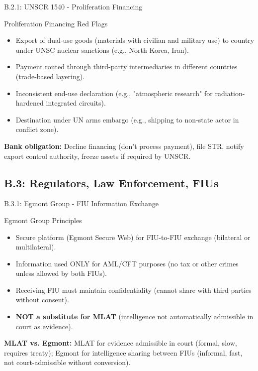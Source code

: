 \documentclass{beamer}
\begin{document}
	\begin{frame}{B.2.1: UNSCR 1540 - Proliferation Financing}
		\begin{block}{Proliferation Financing Red Flags}
			\begin{itemize}
				\item Export of dual-use goods (materials with civilian and military use) to country under UNSC nuclear sanctions (e.g., North Korea, Iran).
				\item Payment routed through third-party intermediaries in different countries (trade-based layering).
				\item Inconsistent end-use declaration (e.g., "atmospheric research" for radiation-hardened integrated circuits).
				\item Destination under UN arms embargo (e.g., shipping to non-state actor in conflict zone).
			\end{itemize}
		\end{block}
		\textbf{Bank obligation:} Decline financing (don't process payment), file STR, notify export control authority, freeze assets if required by UNSCR.
	\end{frame}
	
	\subsection{B.3: Regulators, Law Enforcement, FIUs}
	
	\begin{frame}{B.3.1: Egmont Group - FIU Information Exchange}
		\begin{block}{Egmont Group Principles}
			\begin{itemize}
				\item Secure platform (Egmont Secure Web) for FIU-to-FIU exchange (bilateral or multilateral).
				\item Information used ONLY for AML/CFT purposes (no tax or other crimes unless allowed by both FIUs).
				\item Receiving FIU must maintain confidentiality (cannot share with third parties without consent).
				\item \textbf{NOT a substitute for MLAT} (intelligence not automatically admissible in court as evidence).
			\end{itemize}
		\end{block}
		\textbf{MLAT vs. Egmont:} MLAT for evidence admissible in court (formal, slow, requires treaty); Egmont for intelligence sharing between FIUs (informal, fast, not court-admissible without conversion).
	\end{frame}
	
\end{document}
